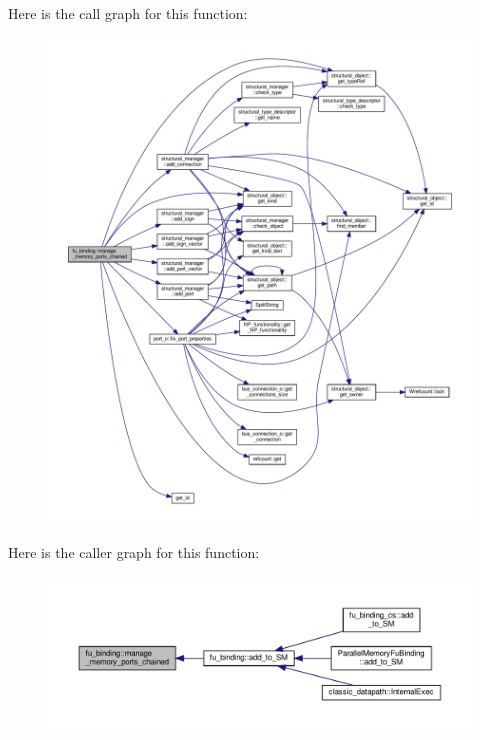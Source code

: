 Here is the call graph for this function\+:
\nopagebreak
\begin{figure}[H]
\begin{center}
\leavevmode
\includegraphics[width=350pt]{d8/d04/classfu__binding_a29c11d53e1beb8a97c8968a67a935d8b_cgraph}
\end{center}
\end{figure}
Here is the caller graph for this function\+:
\nopagebreak
\begin{figure}[H]
\begin{center}
\leavevmode
\includegraphics[width=350pt]{d8/d04/classfu__binding_a29c11d53e1beb8a97c8968a67a935d8b_icgraph}
\end{center}
\end{figure}
\mbox{\label{classfu__binding_a18f39279fa00ac40a2990cdbff230485}} 
